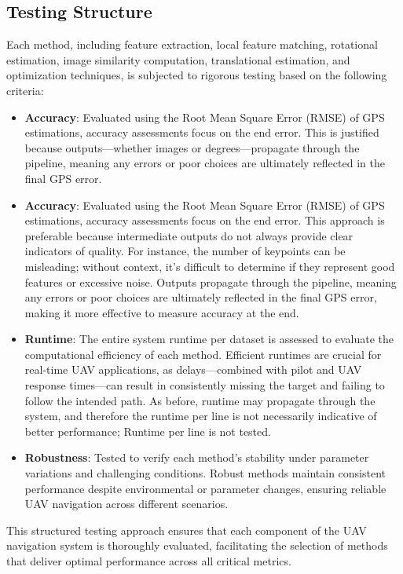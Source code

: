 \subsection{Testing Structure}

Each method, including feature extraction, local feature matching, rotational estimation, image similarity computation, translational estimation, and optimization techniques, is subjected to rigorous testing based on the following criteria:

\begin{itemize}
    \item \textbf{Accuracy}: Evaluated using the Root Mean Square Error (RMSE) of GPS estimations, accuracy assessments focus on the end error. This is justified because outputs—whether images or degrees—propagate through the pipeline, meaning any errors or poor choices are ultimately reflected in the final GPS error.
    \item \textbf{Accuracy}: Evaluated using the Root Mean Square Error (RMSE) of GPS estimations, accuracy assessments focus on the end error. This approach is preferable because intermediate outputs do not always provide clear indicators of quality. For instance, the number of keypoints can be misleading; without context, it's difficult to determine if they represent good features or excessive noise. Outputs propagate through the pipeline, meaning any errors or poor choices are ultimately reflected in the final GPS error, making it more effective to measure accuracy at the end.
    \item \textbf{Runtime}: The entire system runtime per dataset is assessed to evaluate the computational efficiency of each method. Efficient runtimes are crucial for real-time UAV applications, as delays—combined with pilot and UAV response times—can result in consistently missing the target and failing to follow the intended path. As before, runtime may propagate through the system, and therefore the runtime per line is not necessarily indicative of better performance; Runtime per line is not tested. 
    \item \textbf{Robustness}: Tested to verify each method's stability under parameter variations and challenging conditions. Robust methods maintain consistent performance despite environmental or parameter changes, ensuring reliable UAV navigation across different scenarios.
\end{itemize}

This structured testing approach ensures that each component of the UAV navigation system is thoroughly evaluated, facilitating the selection of methods that deliver optimal performance across all critical metrics.

